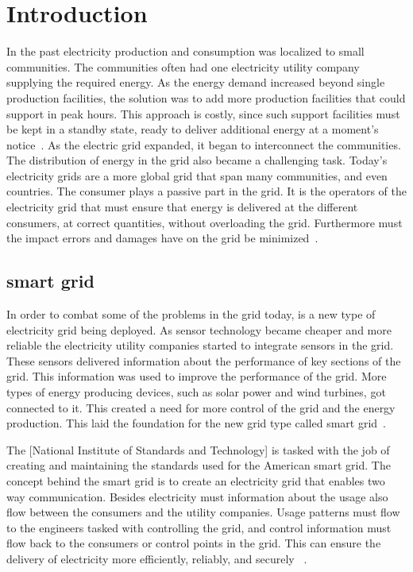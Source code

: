 \chapter{Introduction}
In the past electricity production and consumption was localized to small communities. The communities often had one electricity utility company supplying the required energy. As the energy demand increased beyond single production facilities, the solution was to add more production facilities that could support in peak hours. This approach is costly, since such support facilities must be kept in a standby state, ready to deliver additional energy at a moment’s notice~\citep{RefWorks:46}. As the electric grid expanded, it began to interconnect the communities. The distribution of energy in the grid also became a challenging task. Today's electricity grids are a more global grid that span many communities, and even countries. The consumer plays a passive part in the grid. It is the operators of the electricity grid that must ensure that energy is delivered at the different consumers, at correct quantities, without overloading the grid. Furthermore must the impact errors and damages have on the grid be minimized~\citep{RefWorks:43}.

\section{smart grid}
In order to combat some of the problems in the grid today, is a new type of electricity grid being deployed. As sensor technology became cheaper and more reliable the electricity utility companies started to integrate sensors in the grid. These sensors delivered information about the performance of key sections of the grid. This information was used to improve the performance of the grid. More types of energy producing devices, such as solar power and wind turbines, got connected to it. This created a need for more control of the grid and the energy production. This laid the foundation for the new grid type called smart grid~\citep{RefWorks:43}.

The [National Institute of Standards and Technology] is tasked with the job of creating and maintaining the standards used for the American smart grid. The concept behind the smart grid is to create an electricity grid that enables two way communication. Besides electricity must information about the usage also flow between the consumers and the utility companies. Usage patterns must flow to the engineers tasked with controlling the grid, and control information must flow back to the consumers or control points in the grid. This can ensure the delivery of electricity more efficiently, reliably, and securely ~\citep{RefWorks:42}. 

